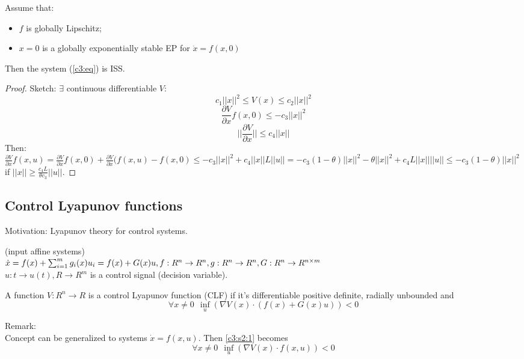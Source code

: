 \begin{Theorem}
 Assume that:
 \begin{itemize}
     \item $f$ is globally Lipschitz;
     \item $x = 0$ is a globally exponentially stable EP for $\dot x = f(x,0)$
 \end{itemize}
 Then the system (\ref{c3:eq}) is ISS.
 
 \begin{proof}
 Sketch:
 $\exists$ continuous differentiable $V$:
 $$c_1||x||^2 \le V(x) \le c_2||x||^2$$
 $$ \frac{\partial V}{\partial x}f(x,0) \le -c_3||x||^2$$
 $$||\frac{\partial V}{\partial x}|| \le c_4||x||$$
 Then: \\
  $\frac{\partial V}{\partial x}f(x,u)=\frac{\partial V}{\partial x}f(x,0)+\frac{\partial V}{\partial x}(f(x,u)-f(x,0) \le -c_3||x||^2+c_4||x||L||u|| = -c_3(1-\theta)||x||^2-\theta||x||^2+c_4L||x||||u|| \le -c_3(1-\theta)||x||^2$ \\
  if $||x|| \ge \frac{c_4L}{\theta c_3}||u||$.
 \end{proof}
\end{Theorem}

\subsection{Control Lyapunov functions}

Motivation: Lyapunov theory for control systems.

(input affine systems) \\
$\dot x = f(x) + \sum_{i=1}^{m}g_i(x)u_i = f(x) + G(x)u, \\ f:R^n \to R^n, g:R^n \to R^n, G:R^n \to R^{n \times m}$ \\
$u:t \to u(t), R \to R^m$ is a control signal (decision variable).

\begin{Definition}
 A function $V:R^n \to R$ is a control Lyapunov function (CLF) if it's differentiable positive definite, radially unbounded and 
 \begin{equation} \label{c3:s2:1}
     \forall x \neq 0 \ \ \inf_u (\nabla V(x) \cdot (f(x)+G(x)u)) < 0 
 \end{equation}
\end{Definition}

Remark: \\
Concept can be generalized to systems $\dot x = f(x,u)$. Then \ref{c3:s2:1} becomes
$$\forall x \neq 0 \ \ \inf_u (\nabla V(x) \cdot f(x,u)) < 0 $$

